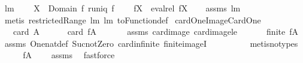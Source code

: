 \begin{isabellebody}
%
\isadelimproof
\isanewline
%
\endisadelimproof
\isanewline
{}\isamarkupfalse%
\ lm{}{}{}{\isacharcolon}\ \isanewline
\ \ \ {\isachardoublequoteopen}X\ {\isasymsubseteq}\ Domain\ f{\isachardoublequoteclose}\ {\isachardoublequoteopen}runiq\ f{\isachardoublequoteclose}\ \isanewline
\ \ \ {\isachardoublequoteopen}f{\isacharbackquote}{\isacharbackquote}X\ {\isacharequal}\ {\isacharparenleft}eval{\isacharunderscore}rel\ f{\isacharparenright}{\isacharbackquote}X{\isachardoublequoteclose}\isanewline
%
\isadelimproof
\ \ %
\endisadelimproof
%
\isatagproof
{}\isamarkupfalse%
\ assms\ lm{}{}{}\ \isamarkupfalse%
\ {\isacharparenleft}metis\ restrictedRange\ lm{}{}{}\ lm{}{}{}\ toFunction{\isacharunderscore}def{\isacharparenright}%
\endisatagproof
{\isafoldproof}%
%
\isadelimproof
\isanewline
%
\endisadelimproof
\isanewline
{}\isamarkupfalse%
\ cardOneImageCardOne{\isacharcolon}\ \isanewline
\ \ \ {\isachardoublequoteopen}card\ A\ {\isacharequal}\ {}{\isachardoublequoteclose}\ \isanewline
\ \ \ {\isachardoublequoteopen}card\ {\isacharparenleft}f{\isacharbackquote}A{\isacharparenright}\ {\isacharequal}\ {}{\isachardoublequoteclose}\ \isanewline
%
\isadelimproof
\ \ %
\endisadelimproof
%
\isatagproof
{}\isamarkupfalse%
\ assms\ card{\isacharunderscore}image\ card{\isacharunderscore}image{\isacharunderscore}le\ \isanewline
{}\isamarkupfalse%
\ {\isacharminus}\isanewline
\ \ \isamarkupfalse%
\ {\isachardoublequoteopen}finite\ {\isacharparenleft}f{\isacharbackquote}A{\isacharparenright}{\isachardoublequoteclose}\ \isamarkupfalse%
\ assms\ One{\isacharunderscore}nat{\isacharunderscore}def\ Suc{\isacharunderscore}not{\isacharunderscore}Zero\ card{\isacharunderscore}infinite\ finite{\isacharunderscore}imageI\ \isanewline
\ \ \ \ \ \ \ \isamarkupfalse%
\ {\isacharparenleft}metis{\isacharparenleft}no{\isacharunderscore}types{\isacharparenright}{\isacharparenright}\ \isanewline
\ \ \isamarkupfalse%
\ \isamarkupfalse%
\ {\isachardoublequoteopen}f{\isacharbackquote}A\ {\isasymnoteq}\ {\isacharbraceleft}{\isacharbraceright}{\isachardoublequoteclose}\ \isamarkupfalse%
\ assms\ \isamarkupfalse%
\ fastforce\isanewline
\ \ \isamarkupfalse%

\end{isabellebody}
